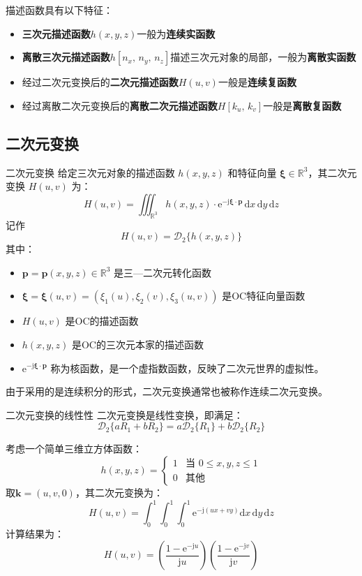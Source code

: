 \documentclass[lang=cn,newtx,10pt,scheme=chinese]{elegantbook}
\newcommand{\md}{\mathrm{d}}
\newcommand{\me}{\mathrm{e}}
\newcommand{\mj}{\mathrm{j}}
\begin{document}
描述函数具有以下特征：
\begin{itemize}
    \item \textbf{三次元描述函数}\(h(x,y,z)\)一般为\textbf{连续实函数}
    \item \textbf{离散三次元描述函数}\(h[n_x,\,n_y,\,n_z]\)描述三次元对象的局部，一般为\textbf{离散实函数}
    \item 经过二次元变换后的\textbf{二次元描述函数}\(H(u, v)\)一般是\textbf{连续复函数}
    \item 经过离散二次元变换后的\textbf{离散二次元描述函数}\(H[k_u,\,k_v]\)一般是\textbf{离散复函数}
\end{itemize}


\subsection{二次元变换}
\begin{definition}{二次元变换}
    给定三次元对象的描述函数 \( h(x,y,z) \) 和特征向量 \(\bm{\xi} \in \mathbb{R}^3\)，其二次元变换 \( H(u, v) \) 为：
    \[
        H(u, v) = \iiint_{\mathbb{R}^3} h(x,y,z) \cdot \me^{-\mj \bm{\xi} \cdot \bm{p}} \,\md x\,\md y\,\md z
    \]
    记作
    \[
        H(u, v)=\mathcal{D}_{2}\{h(x,y,z)\}
    \]
    其中：
    \begin{itemize}
        \item \(\bm{p}=\bm{p}(x,y,z)\in\mathbb{R}^3\) 是三—二次元转化函数
        \item \(\bm{\xi}=\bm{\xi}(u,v)=(\xi_1(u),\xi_2(v),\xi_3(u,v))\) 是OC特征向量函数
        \item \(H(u, v)\) 是OC的描述函数
        \item \(h(x,y,z)\) 是OC的三次元本家的描述函数
        \item \(\me^{-\mj \bm{\xi} \cdot \bm{p}}\) 称为核函数，是一个虚指数函数，反映了二次元世界的虚拟性。
    \end{itemize}
    由于采用的是连续积分的形式，二次元变换通常也被称作连续二次元变换。
\end{definition}

\begin{theorem}{二次元变换的线性性}
    二次元变换是线性变换，即满足：
    \[
        \mathcal{D}_{2}\{aR_1 + bR_2\} = a\mathcal{D}_{2}\{R_1\} + b\mathcal{D}_{2}\{R_2\}
    \]
\end{theorem}

\begin{example}
    考虑一个简单三维立方体函数：
    \[ h(x,y,z) = \begin{cases}
            1 & \text{当 } 0 \leq x,y,z \leq 1 \\
            0 & \text{其他}
        \end{cases} \]
    取\(\bm{k}=(u,v,0)\)，其二次元变换为：
    \[ H(u, v) = \int_0^1 \int_0^1 \int_0^1 \me^{-\mj (ux + vy)} \md x\,\md y\,\md z \]
    计算结果为：
    \[ H(u, v) = \left(\frac{1 - \me^{-\mj u}}{\mj u}\right)\left(\frac{1 - \me^{-\mj v}}{\mj v}\right)
    \]
\end{example}
\end{document}
